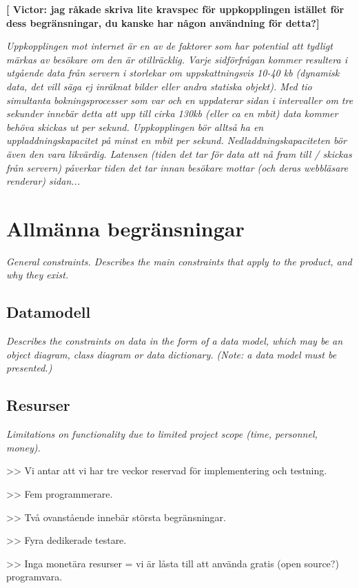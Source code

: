 \documentclass[a4paper, twoside, 11pt, titlepage]{article}
\begin{document}
 \textbf{[ Victor: jag råkade skriva lite kravspec för uppkopplingen istället för dess begränsningar, du kanske har någon användning för detta?]} 

\emph{Uppkopplingen mot internet är en av de faktorer som har potential att tydligt märkas av besökare om den är otillräcklig. Varje sidförfrågan kommer resultera i utgående data från servern i storlekar om uppskattningsvis 10-40 kb (dynamisk data, det vill säga ej inräknat bilder eller andra statiska objekt). Med tio simultanta bokningsprocesser som var och en uppdaterar sidan i intervaller om tre sekunder innebär detta att upp till cirka 130kb (eller ca en mbit) data kommer behöva skickas ut per sekund. Uppkopplingen bör alltså ha en uppladdningskapacitet på minst en mbit per sekund. Nedladdningskapaciteten bör även den vara likvärdig. Latensen (tiden det tar för data att nå fram till / skickas från servern) påverkar tiden det tar innan besökare mottar (och deras webbläsare renderar) sidan...}

\section{Allmänna begränsningar}

\emph{General constraints. Describes the main constraints that apply to the product, and why they exist.}

	\subsection{Datamodell}

	\emph{Describes the constraints on data in the form of a data model, which may be an object diagram, class diagram or data dictionary. (Note: a data model must be presented.)}

	\subsection{Resurser}

	\emph{Limitations on functionality due to limited project scope (time, personnel, money).}

	>> Vi antar att vi har tre veckor reservad för implementering och testning.

	>> Fem programmerare.

	>> Två ovanstående innebär största begränsningar.

	>> Fyra dedikerade testare.

	>> Inga monetära resurser = vi är låsta till att använda gratis (open source?) programvara.
\end{document}
